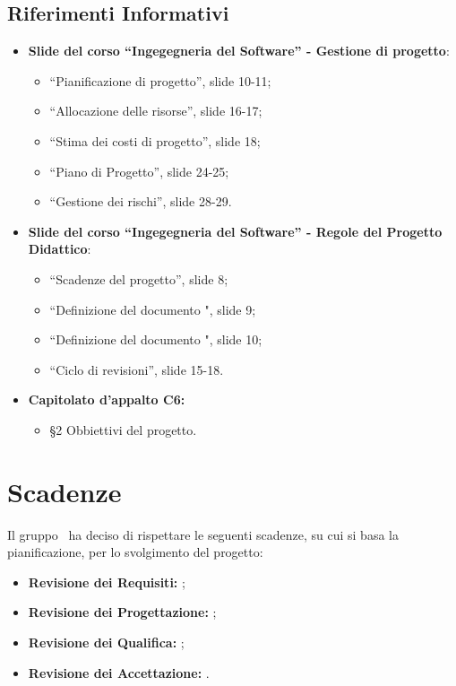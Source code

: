 \documentclass[PianoDiProgetto.tex]{subfiles}
\begin{document}
\subsection{Riferimenti Informativi}
\begin{itemize}
	\item \textbf{Slide del corso ``Ingegegneria del Software'' - Gestione di progetto}:
	\begin{itemize}
		\item ``Pianificazione di progetto'', slide 10-11;
		\item ``Allocazione delle risorse'', slide 16-17;
		\item ``Stima dei costi di progetto'', slide 18;
		\item ``Piano di Progetto'', slide 24-25;
		\item ``Gestione dei rischi'', slide 28-29.
	\end{itemize}
	\item \textbf{Slide del corso ``Ingegegneria del Software'' - Regole del Progetto Didattico}:
	\begin{itemize}
		\item ``Scadenze del progetto'', slide 8;
		\item ``Definizione del documento \technology", slide 9;
		\item ``Definizione del documento \product", slide 10;
		\item ``Ciclo di revisioni'', slide 15-18.
	\end{itemize}
	\item \textbf{Capitolato d'appalto C6: \progetto}
	\begin{itemize}
		\item \S2 Obbiettivi del progetto.
	\end{itemize}
\end{itemize}

\section{Scadenze}
Il gruppo \gruppo\ ha deciso di rispettare le seguenti scadenze, su cui si basa la pianificazione, per lo svolgimento del progetto:
\begin{itemize}
	\item \textbf{Revisione dei Requisiti:} ;
	\item \textbf{Revisione dei Progettazione:} ;
	\item \textbf{Revisione dei Qualifica:} ;
	\item \textbf{Revisione dei Accettazione:} .
\end{itemize}
\end{document}

